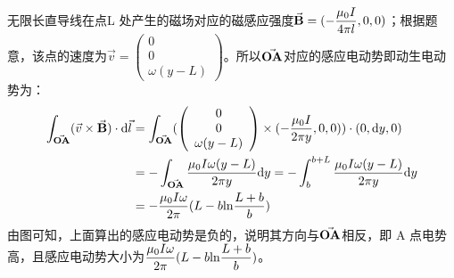 \documentclass[AutoFakeBold]{article}
\begin{document}
无限长直导线在点L 处产生的磁场对应的磁感应强度$\va{B} = (-\dfrac{\mu_0 I}{4\pi l},0,0)$；根据题意，该点的速度为$\vec{v} = \left(\begin{array}{c}
	0\\
	0\\
	\omega(y-L)
\end{array}\right)$。所以$\va{OA}$对应的感应电动势即动生电动势为：
\begin{align*}
			\int_{\va{OA}} (\vec{v} \times \va{B} )\cdot \ce{d}\vec{l} & = \int_{\va{OA}} ( \left(\begin{array}{c}
	0\\
	0\\
	\omega(y-L)
\end{array}
\right) \times (-\dfrac{\mu_0 I}{2\pi y},0,0) )\cdot(0,\ce{d}y,0)\\
 & = -\int_{\va{OA}}\dfrac{\mu_0 I\omega(y-L)}{2\pi y}\ce{d}y = -\int_{b}^{b+L}\dfrac{\mu_0 I\omega(y-L)}{2\pi y}\ce{d}y\\
 & = -\dfrac{\mu_0 I\omega}{2\pi }(L-b\ce{ln}\frac{L+b}{b})
\end{align*}
由图可知，上面算出的感应电动势是负的，说明其方向与$\va{OA}$相反，即 A 点电势高，且感应电动势大小为$\dfrac{\mu_0 I\omega}{2\pi }(L-b\ce{ln}\dfrac{L+b}{b})$。
\end{document}
